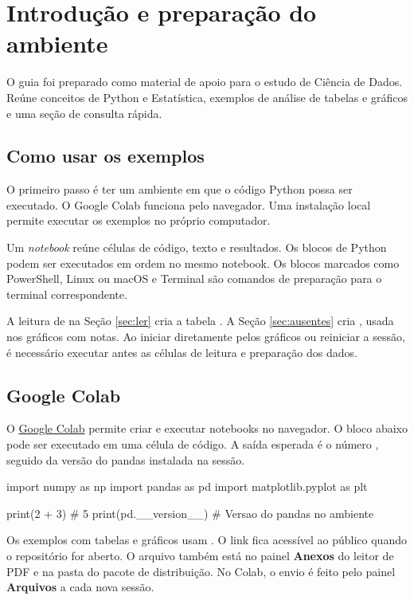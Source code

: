 \clearpage
\section{Introdução e preparação do ambiente}
\label{sec:ambiente}

O guia foi preparado como material de apoio para o estudo de Ciência de Dados. Reúne conceitos de Python e Estatística, exemplos de análise de tabelas e gráficos e uma seção de consulta rápida.

\subsection{Como usar os exemplos}

O primeiro passo é ter um ambiente em que o código Python possa ser executado. O Google Colab funciona pelo navegador. Uma instalação local permite executar os exemplos no próprio computador.

Um \emph{notebook} reúne células de código, texto e resultados. Os blocos de Python podem ser executados em ordem no mesmo notebook. Os blocos marcados como PowerShell, Linux ou macOS e Terminal são comandos de preparação para o terminal correspondente.

A leitura de  na Seção \ref{sec:ler} cria a tabela . A Seção \ref{sec:ausentes} cria , usada nos gráficos com notas. Ao iniciar diretamente pelos gráficos ou reiniciar a sessão, é necessário executar antes as células de leitura e preparação dos dados.

\subsection{Google Colab}

O \href{https://colab.research.google.com/}{Google Colab} permite criar e executar notebooks no navegador. O bloco abaixo pode ser executado em uma célula de código. A saída esperada é o número , seguido da versão do pandas instalada na sessão.

\begin{exemplo}
import numpy as np
import pandas as pd
import matplotlib.pyplot as plt

print(2 + 3)           # 5
print(pd.__version__)  # Versao do pandas no ambiente
\end{exemplo}

Os exemplos com tabelas e gráficos usam . O link \baixarcsv{} fica acessível ao público quando o repositório for aberto. O arquivo também está no painel \textbf{Anexos} do leitor de PDF e na pasta  do pacote de distribuição. No Colab, o envio é feito pelo painel \textbf{Arquivos} a cada nova sessão.

